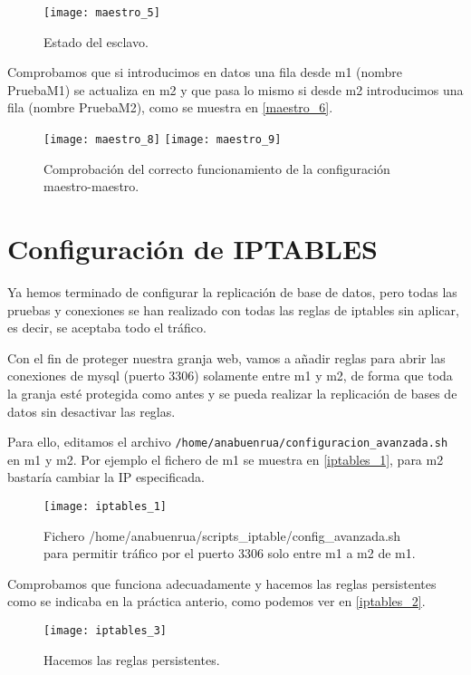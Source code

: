\begin{figure}[h!]
\begin{center}
\caption{Estado del esclavo.}
\label{maestro_5}
\texttt{[image: maestro\_5]}
\end{center}
\end{figure}

Comprobamos que si introducimos en datos una fila desde m1 (nombre PruebaM1) se actualiza en m2 y que pasa lo mismo si desde m2 introducimos una fila (nombre PruebaM2), como se muestra en \eqref{maestro_6}.

\begin{figure}[h!]
\begin{center}
\caption{Comprobación del correcto funcionamiento de la configuración maestro-maestro.}
\label{maestro_6}
\texttt{[image: maestro\_8]}
\texttt{[image: maestro\_9]}
\end{center}
\end{figure}


\chapter{Configuración de IPTABLES}

Ya hemos terminado de configurar la replicación de base de datos, pero todas las pruebas y conexiones se han realizado con todas las reglas de iptables sin aplicar, es decir, se aceptaba todo el tráfico.

Con el fin de proteger nuestra granja web, vamos a añadir reglas para abrir las conexiones de mysql (puerto 3306) solamente entre m1 y m2, de forma que toda la granja esté protegida como antes y se pueda realizar la replicación de bases de datos sin desactivar las reglas.

Para ello, editamos el archivo \verb|/home/anabuenrua/configuracion_avanzada.sh| en m1 y m2. Por ejemplo el fichero de m1 se muestra en \eqref{iptables_1}, para m2 bastaría cambiar la IP especificada.

\begin{figure}[h!]
\begin{center}
\caption{Fichero /home/anabuenrua/scripts\_iptable/config\_avanzada.sh para permitir tráfico por el puerto 3306 solo entre m1 a m2 de m1.}
\label{iptables_1}
\texttt{[image: iptables\_1]}
\end{center}
\end{figure}

Comprobamos que funciona adecuadamente y hacemos las reglas persistentes como se indicaba en la práctica anterio, como podemos ver en \eqref{iptables_2}.

\begin{figure}[h!]
\begin{center}
\caption{Hacemos las reglas persistentes.}
\label{iptables_2}
\texttt{[image: iptables\_3]}
\end{center}
\end{figure}

